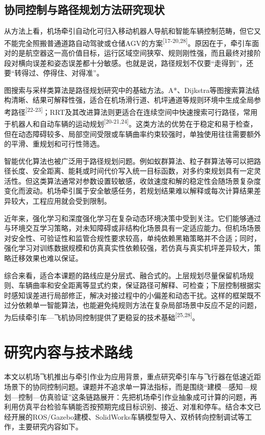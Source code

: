 \subsection{协同控制与路径规划方法研究现状}

从方法上看，机场牵引自动化可归入移动机器人导航和智能车辆控制范畴，但它又不能完全照搬普通道路自动驾驶或仓储AGV的方案\textsuperscript{[17-20,28]}。原因在于，牵引车面对的是航空器这一高价值目标，运行区域空间狭窄、规则刚性强，而且最终对接阶段对横向误差和姿态误差都十分敏感。也就是说，路径规划不仅要“走得到”，还要“转得过、停得住、对得准”。

图搜索与采样类算法是路径规划研究中的基础方法。A*、Dijkstra等图搜索算法结构清晰、结果可解释性强，适合在机场滑行道、机坪通道等规则环境中生成全局参考路径\textsuperscript{[22-23]}；RRT及其改进算法则更适合在连续空间中快速搜索可行路径，常用于机器人和自动车辆的运动规划\textsuperscript{[20-21,24]}。这类方法的优势在于稳定和易于检查，但在动态障碍较多、局部空间受限或车辆曲率约束较强时，单独使用往往需要额外的平滑、重规划和可行性筛选。

智能优化算法也被广泛用于路径规划问题。例如蚁群算法、粒子群算法等可以把路径长度、安全距离、能耗或时间代价写入统一目标函数，对多约束规划具有一定灵活性。但这类算法通常对参数设置较敏感，收敛速度和解的稳定性会随场景复杂度变化而波动。机场牵引属于安全敏感任务，若规划结果难以解释或每次计算结果差异较大，工程应用就会受到限制。

近年来，强化学习和深度强化学习在复杂动态环境决策中受到关注。它们能够通过与环境交互学习策略，对未知障碍或非结构化场景具有一定适应能力。但机场场景对安全性、可验证性和监管合规性要求较高，单纯依赖黑箱策略并不合适；同时，强化学习对训练数据规模和仿真真实性依赖较强，若仿真与真实机坪差异较大，策略迁移效果也难以保证。

综合来看，适合本课题的路线应是分层式、融合式的。上层规划尽量保留机场规则、车辆曲率和安全距离等显式约束，保证路径可解释、可检查；下层控制根据实时感知误差进行局部修正，解决对接过程中的小偏差和动态干扰。这样的框架既不过分依赖单一智能算法，也能避免纯规则方法在复杂局部场景中反应不足的问题，为后续牵引车---飞机协同控制提供了更稳妥的技术基础\textsuperscript{[25,28]}。

\section{研究内容与技术路线}

本文以机场飞机推出与牵引作业为应用背景，重点研究牵引车与飞行器在低速近距场景下的协同控制问题。课题并不追求单一算法指标，而是围绕“建模---感知---规划---控制---仿真验证”这条链路展开：先把机场牵引作业抽象成可计算的问题，再利用仿真平台检验车辆能否按预期完成目标识别、接近、对准和停车。结合本文已经开展的ROS/Gazebo建模、SolidWorks车辆模型导入、双桥转向控制调试等工作，主要研究内容如下。

